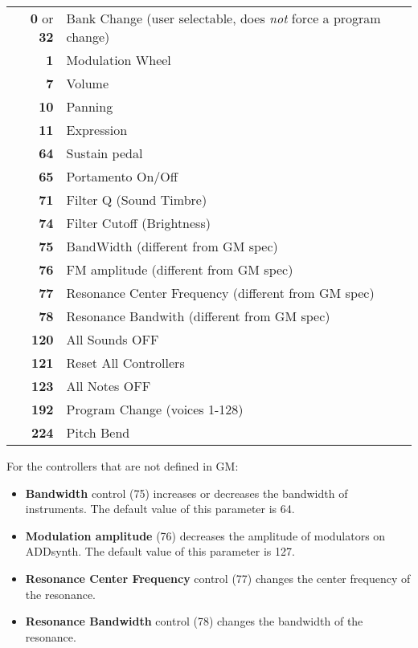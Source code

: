    \begin{tabular}{r l}
      \textbf{0} or \textbf{32} &
         Bank Change (user selectable, does \textsl{not} force a program
         change) \\
      \textbf{1} &
         Modulation Wheel \\
      \textbf{7} &
         Volume \\
      \textbf{10} &
         Panning \\
      \textbf{11} &
         Expression \\
      \textbf{64} &
         Sustain pedal \\
      \textbf{65} &
         Portamento On/Off \\
      \textbf{71} &
         Filter Q (Sound Timbre) \\
      \textbf{74} &
         Filter Cutoff (Brightness) \\
      \textbf{75} &
         BandWidth (different from GM spec) \\
      \textbf{76} &
         FM amplitude (different from GM spec) \\
      \textbf{77} &
         Resonance Center Frequency (different from GM spec) \\
      \textbf{78} &
         Resonance Bandwith (different from GM spec) \\
      \textbf{120} &
         All Sounds OFF \\
      \textbf{121} &
         Reset All Controllers \\
      \textbf{123} &
         All Notes OFF \\
      \textbf{192} &
         Program Change (voices 1-128) \\
      \textbf{224} &
         Pitch Bend \\
   \end{tabular}

   For the controllers that are not defined in GM:

   \begin{itemize}
      \item \textbf{Bandwidth} control (75) increases or decreases the bandwidth
      of instruments. The default value of this parameter is 64. 
      \item \textbf{Modulation amplitude} (76) decreases the amplitude of
      modulators on ADDsynth. The default value of this parameter is 127. 
      \item \textbf{Resonance Center Frequency} control (77) changes the center
      frequency of the resonance. 
      \item \textbf{Resonance Bandwidth} control (78) changes the bandwidth of the
      resonance. 
   \end{itemize}

